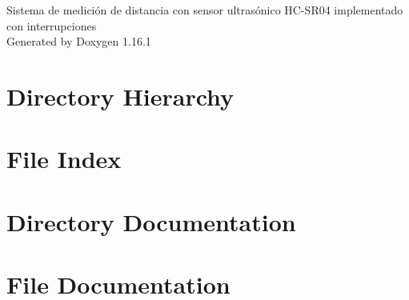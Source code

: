 \documentclass[twoside]{book}
\newcommand{\+}{\discretionary{\mbox{\scriptsize$\hookleftarrow$}}{}{}}
\newcommand{\clearemptydoublepage}{%
    \newpage{\pagestyle{empty}\cleardoublepage}%
  }
\begin{document}
  \raggedbottom
    \hypersetup{pageanchor=false,
                bookmarksnumbered=true,
                pdfencoding=unicode
               }
  \begin{titlepage}
  \vspace*{7cm}
  \begin{center}%
  {\Large Sistema de medición de distancia con sensor ultrasónico HC-\/\+SR04 implementado con interrupciones}\\
  \vspace*{1cm}
  {\large Generated by Doxygen 1.16.1}\\
  \end{center}
  \end{titlepage}
  \clearemptydoublepage
  \tableofcontents
  \clearemptydoublepage
  \hypersetup{pageanchor=true}
\chapter{Directory Hierarchy}

\chapter{File Index}

\chapter{Directory Documentation}




\chapter{File Documentation}

  \backmatter
  \newpage
  \clearemptydoublepage
  \printindex
\end{document}
